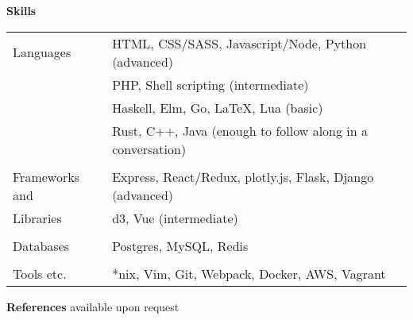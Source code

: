 \documentclass[10pt,notitlepage,oneside,draft]{article}
\begin{document}
\begin{flushleft}
  \large
  \textbf{Skills} \\
  \vspace{12pt}
  \normalsize
  \begin{tabular}{ p{86pt} | l  }
      Languages & HTML, CSS/SASS, Javascript/Node, Python (advanced) \\
    & PHP, Shell scripting (intermediate) \\
    & Haskell, Elm, Go, LaTeX, Lua (basic) \\
    & Rust, C++, Java (enough to follow along in a conversation) \\
    & \\
    Frameworks and & Express, React/Redux, plotly.js, Flask, Django (advanced) \\
    Libraries & d3, Vue (intermediate) \\
    & \\
    Databases & Postgres, MySQL, Redis \\
    & \\
    Tools etc. & *nix, Vim\footnotemark[1], Git, Webpack, Docker, AWS, Vagrant 
  \end{tabular}
  \vspace{20pt}


  \large
  \textbf{References}
  \normalsize
  available upon request



\end{flushleft}
\end{document}

